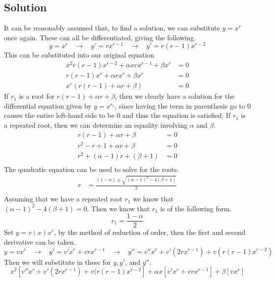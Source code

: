 \documentclass{article}
\theoremstyle{definition}
\begin{document}
    \subsection*{Solution}
    It can be reasonably assumed that, to find a solution, we can substitute $y = x^r$ once again. These can all be differentiated, giving the following.
    \[
        y = x^r \ \ \ \ \longrightarrow \ \ \ \ y' = r x^{r-1} \ \ \ \ \longrightarrow \ \ \ \ y' = r (r-1) x^{r-2}
    \] 
    This can be substituted into our original equation
    \begin{align*}
        x^2 r (r-1) x^{r-2} + \alpha x r x^{r-1} + \beta x^r &= 0 \\
        r (r-1) x^r + \alpha r x^r + \beta x^r &= 0 \\
        x^r(r (r-1) + \alpha r + \beta) &= 0 
    \end{align*}
    If $r_1$ is a root for $r(r-1) + \alpha r + \beta$, then we clearly have a solution for the differential equation given by $y = x^{r_1}$, since having the term in parenthesis go to 0 causes the entire left-hand side to be 0 and thus the equation is satisfied. If $r_1$ is a repeated root, then we can determine an equality involving $\alpha$ and $\beta$.
    \begin{align*}
        r(r - 1) + \alpha r + \beta &= 0 \\
        r^2 - r + 1 + \alpha r + \beta &= 0 \\
        r^2 + (\alpha - 1)r + (\beta + 1) &= 0 \\
    \end{align*}
    The quadratic equation can be used to solve for the roots.
    \begin{align*}
        r &= \frac{(1- \alpha) \pm \sqrt{(\alpha - 1)^2 - 4(\beta + 1)} }{2} \\
    \end{align*}
    Assuming that we have a repeated root $r_1$ we know that $(\alpha - 1)^2 - 4(\beta + 1) = 0$. Then we know that $r_1$ is of the following form.
    \[
    r_1 = \frac{1- \alpha}{2}
    \] 
    Set $y = v(x)x^r$, by the method of reduction of order, then the first and second derivative can be taken.
    \[
    y = v x^r \ \ \ \ \longrightarrow \ \ \ \ y' = v' x^r + v r x^{r-1} \ \ \ \ \longrightarrow \ \ \ \ y'' = v'' x^r + v' (2 r x^{r-1}) + v (r (r-1) x^{r-2}) 
    \] 
    Then we will substitute in these for $y, y'$, and $y''$.
    \[
        x^2 \left[
            v'' x^r + v' (2 r x^{r-1}) + v (r (r-1) x^{r-2}
        \right] + \alpha x \left[
            v' x^r + v r x^{r-1}
        \right] + \beta \left[ v x^r \right]
    \] 
\end{document}
